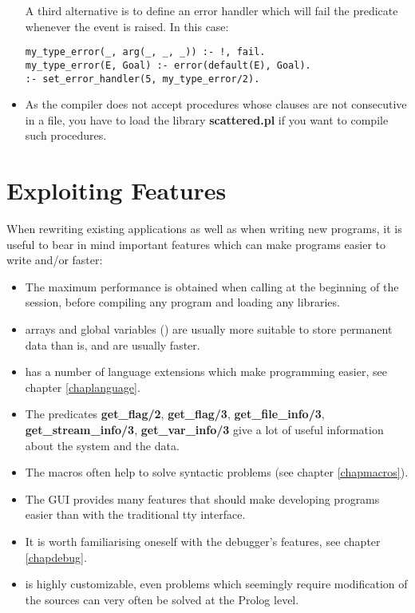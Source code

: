\begin{itemize}
A third alternative
is to define an error handler which will fail the predicate
whenever the event is raised. In this case:
\begin{verbatim}
my_type_error(_, arg(_, _, _)) :- !, fail.
my_type_error(E, Goal) :- error(default(E), Goal).
:- set_error_handler(5, my_type_error/2).
\end{verbatim}

\item As the {\eclipse} compiler does not accept procedures whose clauses
are not consecutive in a file, you have to load the library {\bf scattered.pl}
if you want to compile such procedures.

\end{itemize}


\section{Exploiting {\eclipse} Features}
When rewriting existing applications as well as when writing new programs,
it is useful to bear in mind important {\eclipse} features which can make
programs easier to write and/or faster:
\begin{itemize}
\item The maximum performance is obtained when calling 
at the beginning of the session, before compiling any program and loading
any libraries.

\item {\eclipse} arrays and global variables () are usually
more suitable to store permanent data than  is, and are usually
faster.

\item {\eclipse} has a number of language extensions which make programming
easier, see chapter \ref{chaplanguage}.

\item The predicates {\bf get\_flag/2}, {\bf get\_flag/3},
{\bf get\_file\_info/3}, {\bf get\_stream\_info/3}, {\bf get\_var\_in\-fo/3}
give a lot of useful information about the system and the data.

\item The {\eclipse} macros often help to solve syntactic problems
(see chapter \ref{chapmacros}).

\item The {\tkeclipse} GUI provides many features that should make
developing programs easier than with the traditional tty interface.

\item It is worth familiarising oneself with the debugger's features, 
see chapter \ref{chapdebug}.

\item {\eclipse} is highly customizable, even problems which seemingly
require modification of the {\eclipse} sources
can very often be solved at the Prolog level.
\end{itemize}

